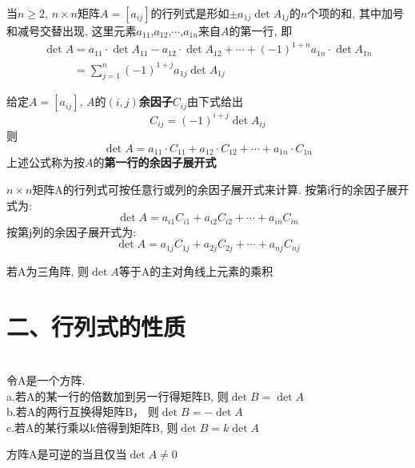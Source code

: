 \begin{definition}
当$n\geqslant 2$, $n\times n$矩阵$A=[a_{ij}]$的行列式是形如$\pm a_{1j}\det A_{1j}$的$n$个项的和, 其中加号和减号交替出现, 这里元素$a_{11}$,$a_{12}$,$\cdots$,$a_{1n}$来自$A$的第一行, 即
\[\begin{array}{l}
\det A=a_{11}\cdot\det A_{11}-a_{12}\cdot\det A_{12}+\cdots+(-1)^{1+n}a_{1n}\cdot\det A_{1n}\\
\phantom{\det A}=\displaystyle\sum_{j=1}^n(-1)^{1+j}a_{1j}\det A_{1j}
\end{array}\]
\end{definition}\vspace{4ex}

给定$A=[a_{ij}]$, $A$的$(i,j)$\textbf{余因子}$C_{ij}$由下式给出
\[C_{ij}=(-1)^{i+j}\det A_{ij}\]
则
\[\det A=a_{11}\cdot C_{11}+a_{12}\cdot C_{12}+\cdots+a_{1n}\cdot C_{1n}\]
上述公式称为按$A$的\textbf{第一行的余因子展开式}\\[2ex]

\begin{theorem}
$n\times n$矩阵A的行列式可按任意行或列的余因子展开式来计算. 按第i行的余因子展开式为:
\[\det A=a_{i1}C_{i1}+a_{i2}C_{i2}+\cdots+a_{in}C_{in}\]
按第j列的余因子展开式为:
\[\det A=a_{1j}C_{1j}+a_{2j}C_{2j}+\cdots+a_{nj}C_{nj}\]
\end{theorem}\vspace{4ex}

\begin{theorem}
若A为三角阵, 则$\det A$等于A的主对角线上元素的乘积
\end{theorem}\vspace{8ex}

\section{二、行列式的性质}
\begin{theorem}[行变换]\ \\
令A是一个方阵.\\
a.若A的某一行的倍数加到另一行得矩阵B, 则$\det B=\det A$\\
b.若A的两行互换得矩阵B， 则$\det B=-\det A$\\
c.若A的某行乘以k倍得到矩阵B, 则$\det B=k\det A$
\end{theorem}\vspace{4ex}

\begin{theorem}
方阵A是可逆的当且仅当$\det A\neq0$
\end{theorem}\vspace{4ex}


